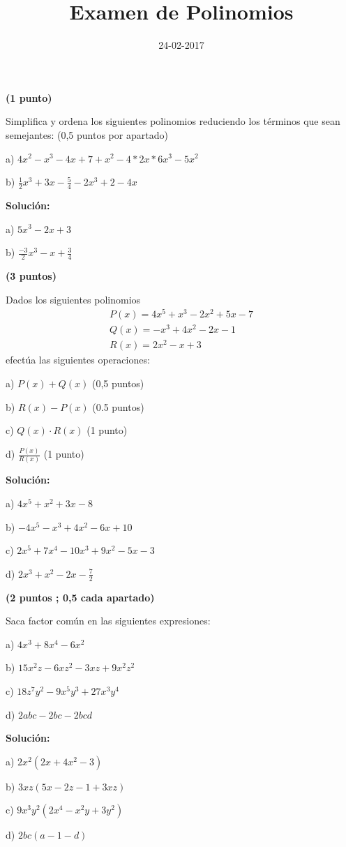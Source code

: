 \documentclass[palatino,noprobframes]{CuartillaSafa}
\title{Examen de Polinomios}
\date{24-02-2017}
\renewcommand{\solution}[1]{\textbf{Solución:}
#1
}
\begin{document}
\cabecera
\pagestyle{fancy}

\begin{problem}\textbf{(1 punto)}

Simplifica y ordena los siguientes polinomios reduciendo los términos que sean semejantes: (0,5 puntos por apartado)

a) $4x^2-x^3-4x+7+x^2-4*2x*6x^3-5x^2$

b) $\frac{1}{2}x^3+3x-\frac{5}{4}-2x^3+2-4x$

\solution{

a) $5x^3-2x+3$

b) $\frac{-3}{2}x^3-x+\frac{3}{4}$

}
\end{problem}

\begin{problem}\textbf{(3 puntos)}

Dados los siguientes polinomios
\begin{align*}
P(x) = 4x^5+x^3-2x^2+5x - 7 \\
Q(x) = -x^3+4x^2-2x-1 \\
R(x) = 2x^2-x+3
\end{align*}
efectúa las siguientes operaciones:

a) $P(x) +Q(x)$ (0,5 puntos)

b) $R(x) - P(x)$ (0.5 puntos)

c) $Q(x)\cdot R(x)$ (1 punto)

d) $\frac{P(x)}{R(x)}$ (1 punto)

\solution{

a) $ 4x^5+x^2+3x-8$

b) $-4x^5-x^3+4x^2-6x+10$

c) $2x^5+7x^4-10x^3+9x^2-5x-3$

d) $ 2x^3+x^2-2x-\frac{7}{2}$


}
\end{problem}

\begin{problem}\textbf{(2 puntos ; 0,5 cada apartado)}

Saca factor común en las siguientes expresiones:

a) $4x^3+8x^4-6x^2$

b) $15x^2z-6xz^2-3xz+9x^2z^2$

c) $18z^7y^2-9x^5y^3+27x^3y^4$

d) $2abc-2bc-2bcd$

\solution{

a) $2x^2(2x+4x^2-3)$

b) $3xz(5x-2z-1+3xz)$

c) $9x^3y^2(2x^4-x^2y+3y^2)$

d) $2bc(a-1-d)$

}
\end{problem}
\end{document}
